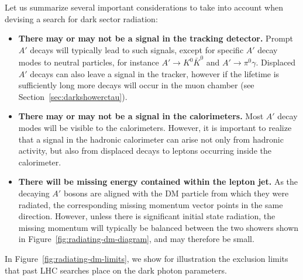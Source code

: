 Let us summarize several important considerations to take into account when devising a search for dark sector radiation:
\begin{itemize}
  \item {\bf There may or may not be a signal in the tracking detector.}
    Prompt $A'$ decays will typically lead to such signals, except for specific $A'$ decay modes to neutral particles, for instance $A' \to K^0 \bar{K}^0$ and $A' \to \pi^0 \gamma$. Displaced $A'$ decays can also leave a signal in the tracker, however if the lifetime is sufficiently long more decays will occur in the muon chamber (see Section~\ref{sec:darkshowerctau}).

  \item {\bf There may or may not be a signal in the calorimeters.}
    Most $A'$ decay modes will be visible to the calorimeters. However, it is important to realize that a signal in the hadronic calorimeter can arise not only from hadronic activity, but also from displaced decays to leptons occurring inside the calorimeter.

  \item {\bf There will be missing energy contained within the lepton jet.}
    As the decaying $A'$ bosons are aligned with the DM particle from which they were radiated, the corresponding missing momentum vector points in the same direction. However, unless there is significant initial state radiation, the missing momentum will typically be balanced between the two showers shown in Figure~\ref{fig:radiating-dm-diagram}, and may therefore be small.
\end{itemize}

In Figure~\ref{fig:radiating-dm-limits}, we show for illustration the exclusion limits that past LHC searches place on the dark photon parameters.

